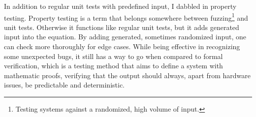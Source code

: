 In addition to regular unit tests with predefined input, I dabbled in property testing. Property testing is a term that belongs somewhere between fuzzing\footnote{Testing systems against a randomized, high volume of input.} and unit tests. Otherwise it functions like regular unit tests, but it adds generated input into the equation. By adding generated, sometimes randomized input, one can check more thoroughly for edge cases. While being effective in recognizing some unexpected bugs, it still has a way to go when compared to formal verification, which is a testing method that aims to define a system with mathematic proofs, verifying that the output should always, apart from hardware issues, be predictable and deterministic.


